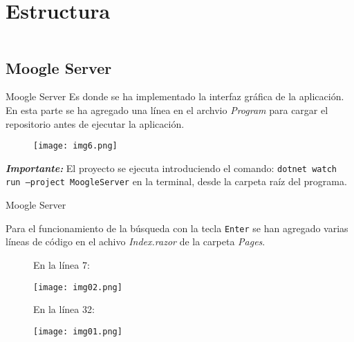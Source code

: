 \section{Estructura}
\begin{frame}
    \begin{columns}[t]
        \begin{column}{.5\textwidth}
          \tableofcontents[sections={1-2},currentsection]
        \end{column}
        \begin{column}{.5\textwidth}
          \tableofcontents[sections={3-4},currentsection]
        \end{column}
    \end{columns}
\end{frame}

\subsection{Moogle Server}
\begin{frame}[fragile]{Moogle Server}
Es donde se ha implementado la interfaz gráfica de la aplicación. En 
esta parte se ha agregado una línea en el archvio \textit{Program}
para cargar el repositorio antes de ejecutar la aplicación.

\pause

\begin{figure}
  \texttt{[image: img6.png]}
\end{figure}


{\textit{\textbf{Importante:}}} El proyecto se ejecuta introduciendo el comando:
{\scriptsize\texttt{dotnet watch run --project MoogleServer}} en la terminal, desde la 
carpeta raíz del programa.
\end{frame}

\begin{frame}[fragile]{Moogle Server}

Para el funcionamiento de la búsqueda con la tecla \texttt{Enter} se han agregado varias 
líneas de código en el achivo \textit{Index.razor} de la carpeta \textit{Pages}.
  
  \pause
  
  \begin{figure}
    En la línea 7:


    \texttt{[image: img02.png]}
  \end{figure}
  
  \pause 

  \begin{figure}
    En la línea 32:


    \texttt{[image: img01.png]}
  \end{figure}

  \end{frame}

